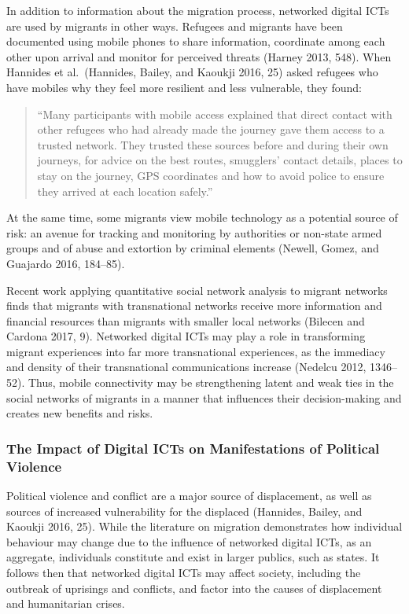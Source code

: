 \documentclass[
]{article}
\begin{document}
In addition to information about the migration process, networked
digital ICTs are used by migrants in other ways. Refugees and migrants
have been documented using mobile phones to share information,
coordinate among each other upon arrival and monitor for perceived
threats (Harney 2013, 548). When Hannides et al.~(Hannides, Bailey, and
Kaoukji 2016, 25) asked refugees who have mobiles why they feel more
resilient and less vulnerable, they found:

\begin{quote}
``Many participants with mobile access explained that direct contact
with other refugees who had already made the journey gave them access to
a trusted network. They trusted these sources before and during their
own journeys, for advice on the best routes, smugglers' contact details,
places to stay on the journey, GPS coordinates and how to avoid police
to ensure they arrived at each location safely.''
\end{quote}

At the same time, some migrants view mobile technology as a potential
source of risk: an avenue for tracking and monitoring by authorities or
non-state armed groups and of abuse and extortion by criminal elements
(Newell, Gomez, and Guajardo 2016, 184--85).

Recent work applying quantitative social network analysis to migrant
networks finds that migrants with transnational networks receive more
information and financial resources than migrants with smaller local
networks (Bilecen and Cardona 2017, 9). Networked digital ICTs may play
a role in transforming migrant experiences into far more transnational
experiences, as the immediacy and density of their transnational
communications increase (Nedelcu 2012, 1346--52). Thus, mobile
connectivity may be strengthening latent and weak ties in the social
networks of migrants in a manner that influences their decision-making
and creates new benefits and risks.

\hypertarget{the-impact-of-digital-icts-on-manifestations-of-political-violence}{%
\subsubsection{The Impact of Digital ICTs on Manifestations of Political
Violence}\label{the-impact-of-digital-icts-on-manifestations-of-political-violence}}

Political violence and conflict are a major source of displacement, as
well as sources of increased vulnerability for the displaced (Hannides,
Bailey, and Kaoukji 2016, 25). While the literature on migration
demonstrates how individual behaviour may change due to the influence of
networked digital ICTs, as an aggregate, individuals constitute and
exist in larger publics, such as states. It follows then that networked
digital ICTs may affect society, including the outbreak of uprisings and
conflicts, and factor into the causes of displacement and humanitarian
crises.
\end{document}
